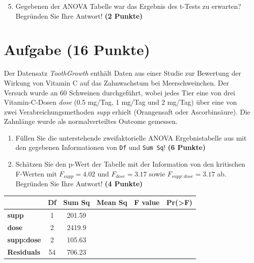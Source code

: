 \documentclass[a4paper, 10pt]{scrartcl}\usepackage[]{graphicx}\usepackage[]{xcolor}
\begin{document}
\begin{enumerate}
  \setcounter{enumi}{4}
\item Gegebenen der ANOVA Tabelle war das Ergebnis des t-Tests zu erwarten?
  Begr{\"u}nden Sie Ihre Antwort! \textbf{(2 Punkte)}
\end{enumerate}

 
\clearpage

\section{Aufgabe \hfill (16 Punkte)}

Der Datensatz \textit{ToothGrowth} enth{\"a}lt Daten aus einer Studie zur
Bewertung der Wirkung von Vitamin C auf das Zahnwachstum bei
Meerschweinchen. Der Versuch wurde an 60 Schweinen durchgef{\"u}hrt, wobei
jedes Tier eine von drei Vitamin-C-Dosen \textit{dose} (0.5 mg/Tag, 1
mg/Tag und 2 mg/Tag) {\"u}ber eine von zwei Verabreichungsmethoden
\textit{supp} erhielt (Orangensaft oder Ascorbins{\"a}ure). Die Zahnl{\"a}nge wurde
als normalverteiltes Outcome gemessen.



\begin{enumerate}
\item F{\"u}llen Sie die unterstehende zweifaktorielle ANOVA Ergebnistabelle aus
  mit den gegebenen Informationen von \texttt{Df} und \texttt{Sum Sq}!
  \textbf{(6 Punkte)}
\item Sch{\"a}tzen Sie den p-Wert der Tabelle mit der Information von den
  kritischen F-Werten mit
  $F_{supp} = 4.02$ und
  $F_{dose} = 3.17$ sowie
  $F_{supp:dose} = 3.17$ ab. Begr{\"u}nden Sie Ihre
  Antwort! \textbf{(4 Punkte)}
\end{enumerate}

\vspace{1Ex}

\begin{center}
  \Large
  \begin{tabular}{l|c|c|c|c|c}
     & \textbf{Df} & \textbf{Sum Sq} & \textbf{Mean Sq} & \textbf{F value} & \textbf{Pr(>F)} \strut\\
    \hline
   \textbf{supp}  & 1 & 201.59 &  &  &  \strut\\
    \hline
    \textbf{dose}  & 2 & 2419.9 &  &  &  \strut\\
    \hline
    \textbf{supp:dose}  & 2 & 105.63 &  &  &  \strut\\
    \hline
   \textbf{Residuals}  & 54 & 706.23 &  &  &  \strut\\
  \end{tabular}
\end{center}
\end{document}
